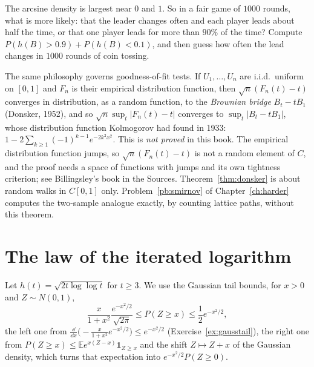 \begin{think}
The arcsine density is largest near $0$ and $1$. So in a fair game of $1000$ rounds, what is more likely: that the leader changes often and each player leads about half the
time, or that one player leads for more than $90\%$ of the time? Compute $P(h(B)>0.9)+P(h(B)<0.1)$, and then guess how often the lead changes in $1000$ rounds of
coin tossing.
\end{think}

\begin{remark}
The same philosophy governs goodness-of-fit tests. If $U_1,\dots,U_n$ are i.i.d.\ uniform on $[0,1]$ and $F_n$ is their empirical distribution function, then
$\sqrt n(F_n(t)-t)$ converges in distribution, as a random function, to the \emph{Brownian bridge} $B_t-tB_1$ (Donsker, 1952), and so
$\sqrt n\sup_t|F_n(t)-t|$ converges to $\sup_t|B_t-tB_1|$, whose distribution function Kolmogorov had found in 1933:
$1-2\sum_{k\ge1}(-1)^{k-1}e^{-2k^2x^2}$. This is \emph{not proved} in this book. The empirical distribution function jumps, so $\sqrt n(F_n(t)-t)$ is
not a random element of $C$, and the proof needs a space of functions with jumps and its own tightness criterion; see Billingsley's book in the Sources.
Theorem~\ref{thm:donsker} is about random walks in $C[0,1]$ only. Problem~\ref{pb:smirnov} of Chapter~\ref{ch:harder} computes the two-sample analogue
exactly, by counting lattice paths, without this theorem.
\end{remark}

\section{The law of the iterated logarithm}

Let $h(t)=\sqrt{2t\log\log t}$ for $t\ge3$. We use the Gaussian tail bounds, for $x>0$ and $Z\sim N(0,1)$,
\begin{equation}\label{eq:gausstail}
\frac x{1+x^2}\frac{e^{-x^2/2}}{\sqrt{2\pi}}\le P(Z\ge x)\le\frac12e^{-x^2/2},
\end{equation}
the left one from $\frac{\dd}{\dd x}\bigl(-\frac x{1+x^2}e^{-x^2/2}\bigr)\le e^{-x^2/2}$ (Exercise~\ref{ex:gausstail}), the right one from $P(Z\ge x)\le\mathbb E e^{x(Z-x)}\mathbf 1_{Z\ge x}$
and the shift $Z\mapsto Z+x$ of the Gaussian density, which turns that expectation into $e^{-x^2/2}P(Z\ge0)$.

